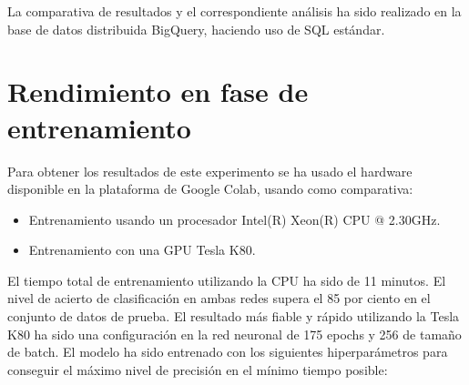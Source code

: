 La comparativa de resultados y el correspondiente análisis ha sido realizado en la base de datos distribuida BigQuery, haciendo uso de SQL estándar.


\section{Rendimiento en fase de entrenamiento}\label{sec:rendimiento-en-fase-de-entrenamiento}
Para obtener los resultados de este experimento se ha usado el hardware disponible en la plataforma de Google Colab, usando como comparativa:
\begin{itemize}
    \item Entrenamiento usando un procesador Intel(R) Xeon(R) CPU @ 2.30GHz.
    \item Entrenamiento con una GPU Tesla K80.
\end{itemize}

El tiempo total de entrenamiento utilizando la CPU ha sido de 11 minutos.
El nivel de acierto de clasificación en ambas redes supera el 85 por ciento en el conjunto de datos de prueba.
El resultado más fiable y rápido utilizando la Tesla K80 ha sido una configuración en la red neuronal de 175 epochs y 256 de tamaño de batch.
El modelo ha sido entrenado con los siguientes hiperparámetros para conseguir el máximo nivel de precisión en el mínimo tiempo posible:

